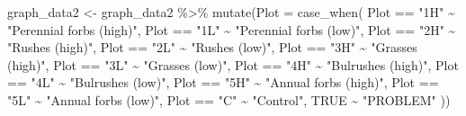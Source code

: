 \documentclass[
]{book}
\newenvironment{Shaded}{\begin{snugshade}}{\end{snugshade}}
\newcommand{\AttributeTok}[1]{\textcolor[rgb]{0.77,0.63,0.00}{#1}}
\newcommand{\ConstantTok}[1]{\textcolor[rgb]{0.00,0.00,0.00}{#1}}
\newcommand{\FunctionTok}[1]{\textcolor[rgb]{0.00,0.00,0.00}{#1}}
\newcommand{\NormalTok}[1]{#1}
\newcommand{\OtherTok}[1]{\textcolor[rgb]{0.56,0.35,0.01}{#1}}
\newcommand{\SpecialCharTok}[1]{\textcolor[rgb]{0.00,0.00,0.00}{#1}}
\newcommand{\StringTok}[1]{\textcolor[rgb]{0.31,0.60,0.02}{#1}}
\begin{document}
\begin{Shaded}
\begin{Highlighting}[]
\NormalTok{graph\_data2 }\OtherTok{\textless{}{-}}\NormalTok{ graph\_data2 }\SpecialCharTok{\%\textgreater{}\%} 
  \FunctionTok{mutate}\NormalTok{(}\AttributeTok{Plot =} \FunctionTok{case\_when}\NormalTok{(}
\NormalTok{    Plot }\SpecialCharTok{==} \StringTok{"1H"} \SpecialCharTok{\textasciitilde{}} \StringTok{"Perennial forbs (high)"}\NormalTok{,}
\NormalTok{    Plot }\SpecialCharTok{==} \StringTok{"1L"} \SpecialCharTok{\textasciitilde{}} \StringTok{"Perennial forbs (low)"}\NormalTok{,}
\NormalTok{    Plot }\SpecialCharTok{==} \StringTok{"2H"} \SpecialCharTok{\textasciitilde{}} \StringTok{"Rushes (high)"}\NormalTok{,}
\NormalTok{    Plot }\SpecialCharTok{==} \StringTok{"2L"} \SpecialCharTok{\textasciitilde{}} \StringTok{"Rushes (low)"}\NormalTok{,}
\NormalTok{    Plot }\SpecialCharTok{==} \StringTok{"3H"} \SpecialCharTok{\textasciitilde{}} \StringTok{"Grasses (high)"}\NormalTok{,}
\NormalTok{    Plot }\SpecialCharTok{==} \StringTok{"3L"} \SpecialCharTok{\textasciitilde{}} \StringTok{"Grasses (low)"}\NormalTok{,}
\NormalTok{    Plot }\SpecialCharTok{==} \StringTok{"4H"} \SpecialCharTok{\textasciitilde{}} \StringTok{"Bulrushes (high)"}\NormalTok{,}
\NormalTok{    Plot }\SpecialCharTok{==} \StringTok{"4L"} \SpecialCharTok{\textasciitilde{}} \StringTok{"Bulrushes (low)"}\NormalTok{,}
\NormalTok{    Plot }\SpecialCharTok{==} \StringTok{"5H"} \SpecialCharTok{\textasciitilde{}} \StringTok{"Annual forbs (high)"}\NormalTok{,}
\NormalTok{    Plot }\SpecialCharTok{==} \StringTok{"5L"} \SpecialCharTok{\textasciitilde{}} \StringTok{"Annual forbs (low)"}\NormalTok{,}
\NormalTok{    Plot }\SpecialCharTok{==} \StringTok{"C"} \SpecialCharTok{\textasciitilde{}} \StringTok{"Control"}\NormalTok{,}
    \ConstantTok{TRUE} \SpecialCharTok{\textasciitilde{}} \StringTok{"PROBLEM"}
\NormalTok{  ))}


\end{Highlighting}
\end{Shaded}
\end{document}
